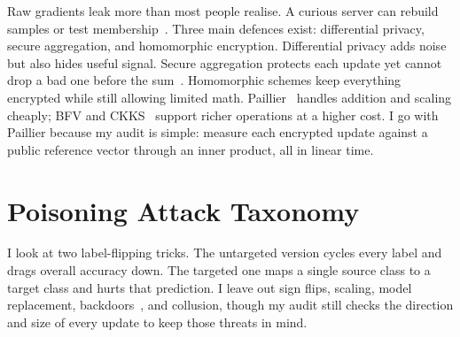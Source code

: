 Raw gradients leak more than most people realise. A curious server can rebuild samples or test membership~\cite{zhu2019deep}. Three main defences exist: differential privacy, secure aggregation, and homomorphic encryption. Differential privacy adds noise but also hides useful signal. Secure aggregation protects each update yet cannot drop a bad one before the sum~\cite{bonawitz2017practical}. Homomorphic schemes keep everything encrypted while still allowing limited math. Paillier~\cite{paillier1999public} handles addition and scaling cheaply; BFV and CKKS~\cite{cheon2017homomorphic} support richer operations at a higher cost. I go with Paillier because my audit is simple: measure each encrypted update against a public reference vector through an inner product, all in linear time.

\section{Poisoning Attack Taxonomy}

\nocite{bhagoji2019analyzing}
I look at two label-flipping tricks. The untargeted version cycles every label and drags overall accuracy down. The targeted one maps a single source class to a target class and hurts that prediction. I leave out sign flips, scaling, model replacement, backdoors~\cite{bagdasaryan2020backdoor}, and collusion, though my audit still checks the direction and size of every update to keep those threats in mind.
